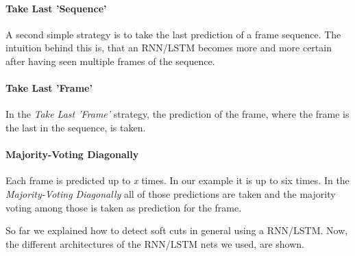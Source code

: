 \paragraph{Take Last 'Sequence'}
A second simple strategy is to take the last prediction of a frame sequence.
The intuition behind this is, that an RNN/LSTM becomes more and more certain after having seen multiple frames of the sequence.

\paragraph{Take Last 'Frame'}
In the \textit{Take Last 'Frame'} strategy, the prediction of the frame, where the frame is the last in the sequence, is taken.

\paragraph{Majority-Voting Diagonally}
Each frame is predicted up to \textit{x} times.
In our example it is up to six times.
In the \textit{Majority-Voting Diagonally} all of those predictions are taken and the majority voting among those is taken as prediction for the frame.


So far we explained how to detect soft cuts in general using a RNN/LSTM.
Now, the different architectures of the RNN/LSTM nets we used, are shown.


